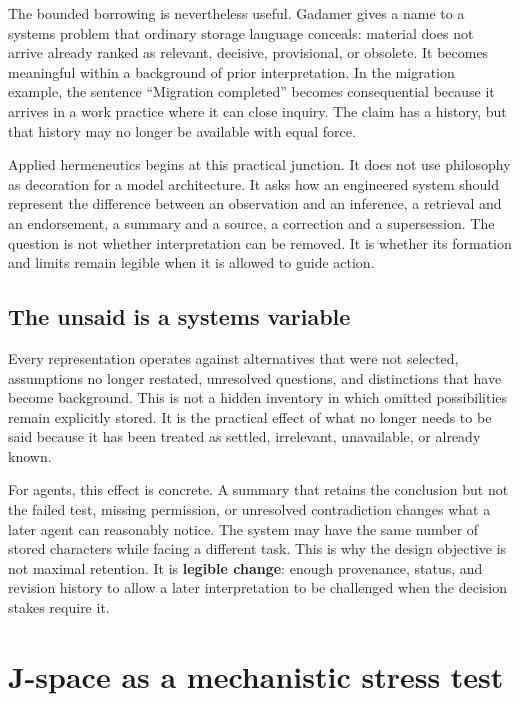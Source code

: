 \documentclass[12pt]{article}
\begin{document}
The bounded borrowing is nevertheless useful. Gadamer gives a name to a systems problem that ordinary storage language conceals: material does not arrive already ranked as relevant, decisive, provisional, or obsolete. It becomes meaningful within a background of prior interpretation. In the migration example, the sentence ``Migration completed'' becomes consequential because it arrives in a work practice where it can close inquiry. The claim has a history, but that history may no longer be available with equal force.

Applied hermeneutics begins at this practical junction. It does not use philosophy as decoration for a model architecture. It asks how an engineered system should represent the difference between an observation and an inference, a retrieval and an endorsement, a summary and a source, a correction and a supersession. The question is not whether interpretation can be removed. It is whether its formation and limits remain legible when it is allowed to guide action.

\subsection{The unsaid is a systems variable}\label{the-unsaid-is-a-systems-variable}

Every representation operates against alternatives that were not selected, assumptions no longer restated, unresolved questions, and distinctions that have become background. This is not a hidden inventory in which omitted possibilities remain explicitly stored. It is the practical effect of what no longer needs to be said because it has been treated as settled, irrelevant, unavailable, or already known.

For agents, this effect is concrete. A summary that retains the conclusion but not the failed test, missing permission, or unresolved contradiction changes what a later agent can reasonably notice. The system may have the same number of stored characters while facing a different task. This is why the design objective is not maximal retention. It is \textbf{legible change}: enough provenance, status, and revision history to allow a later interpretation to be challenged when the decision stakes require it.

\section{J-space as a mechanistic stress test}\label{j-space-as-a-mechanistic-stress-test}
\end{document}
